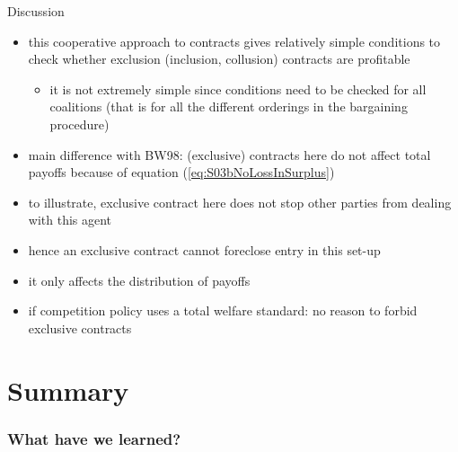 \documentclass[11pt,english]{beamer}
\begin{document}
\begin{frame}{Discussion}
  \begin{itemize}
  \item this cooperative approach to contracts gives relatively simple
    conditions to check whether exclusion (inclusion, collusion)
    contracts are profitable
    \begin{itemize}
    \item it is not extremely simple since conditions need to be
      checked for all coalitions (that is for all the different
      orderings in the bargaining procedure)
    \end{itemize}
  \item main difference with BW98: (exclusive) contracts here do not affect
    total payoffs because of equation (\ref{eq:S03bNoLossInSurplus})
  \item to illustrate, exclusive contract here does not stop other parties from
    dealing with this agent
  \item hence an exclusive contract cannot foreclose entry in this set-up
  \item it only affects the distribution of payoffs
  \item if competition policy uses a total welfare standard: no reason
    to forbid exclusive contracts
  \end{itemize}


\end{frame}

\part[Overview]{Summary}

\section{What have we learned?}
\end{document}
